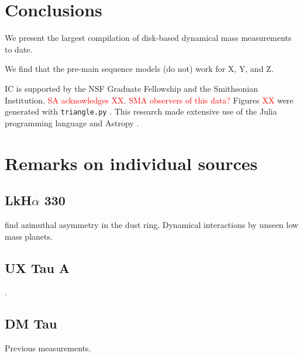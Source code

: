 \documentclass[iop,floatfix,numberedappendix,twocolappendix]{emulateapj}
\newcommand{\todo}[1]{ \textcolor{red}{#1}}
\begin{document}


\section{Conclusions}

We present the largest compilation of disk-based dynamical mass measurements to date.

We find that the pre-main sequence models (do not) work for X, Y, and Z.

\acknowledgments
IC is supported by the NSF Graduate Fellowship and the Smithsonian Institution. \todo{SA acknowledges XX}. \todo{SMA observers of this data?}  Figures \todo{XX} were generated with \texttt{triangle.py} \citep{foreman-mackey14}. This research made extensive use of the Julia programming language \citep{julia12} and Astropy \citep{astropy13}.




\appendix

\section{Remarks on individual sources}

\subsection{LkH$\alpha$ 330}
\citet{isella13} find azimuthal asymmetry in the dust ring. Dynamical interactions by unseen low mass planets.


\subsection{UX Tau A}

\citep{espaillat07}.

\subsection{DM Tau}
Previous measurements.
\end{document}
